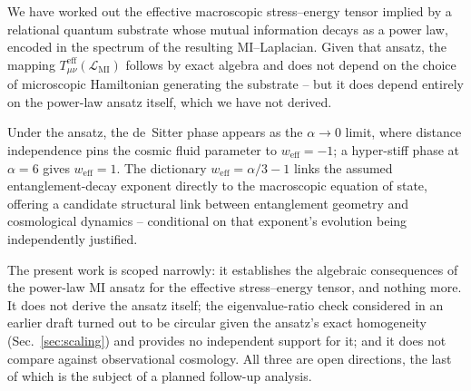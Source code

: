 \documentclass[aps,prd,onecolumn,nofootinbib,preprint]{revtex4-2}
\begin{document}
We have worked out the effective macroscopic stress--energy tensor implied by a relational quantum
substrate whose mutual information decays as a power law, encoded in the spectrum of the resulting
MI--Laplacian. Given that ansatz, the mapping $T^{\mathrm{eff}}_{\mu\nu}(\mathcal{L}_{\mathrm{MI}})$ follows by
exact algebra and does not depend on the choice of microscopic Hamiltonian generating the
substrate -- but it does depend entirely on the power-law ansatz itself, which we have not derived.

Under the ansatz, the de~Sitter phase appears as the $\alpha \to 0$ limit, where distance
independence pins the cosmic fluid parameter to $w_{\mathrm{eff}} = -1$; a hyper-stiff phase at
$\alpha = 6$ gives $w_{\mathrm{eff}} = 1$. The dictionary $w_{\mathrm{eff}} = \alpha/3 - 1$ links the assumed
entanglement-decay exponent directly to the macroscopic equation of state, offering a candidate
structural link between entanglement geometry and cosmological dynamics -- conditional on that
exponent's evolution being independently justified.

The present work is scoped narrowly: it establishes the algebraic consequences of the power-law MI
ansatz for the effective stress--energy tensor, and nothing more. It does not derive the ansatz
itself; the eigenvalue-ratio check considered in an earlier draft turned out to be circular given
the ansatz's exact homogeneity (Sec.~\ref{sec:scaling}) and provides no independent support for it;
and it does not compare against observational cosmology. All three are open directions, the last of
which is the subject of a planned follow-up analysis.
\end{document}
